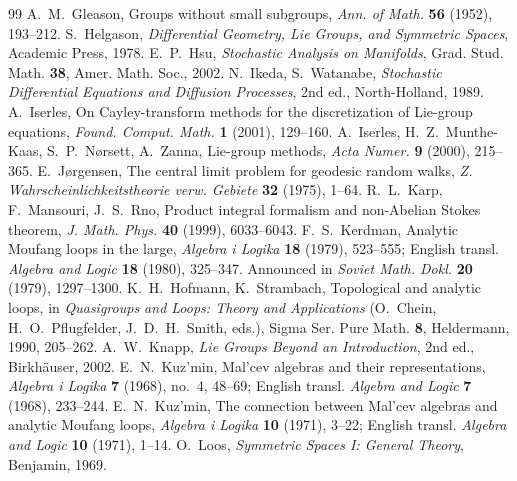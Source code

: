 \documentclass[11pt,reqno]{amsart}
\theoremstyle{definition}
\theoremstyle{remark}
\numberwithin{equation}{section}
\begin{document}
\begin{thebibliography}{99}
 A.~M.~Gleason, Groups without small subgroups, \emph{Ann. of Math.} \textbf{56} (1952), 193--212.
 S.~Helgason, \emph{Differential Geometry, Lie Groups, and Symmetric Spaces}, Academic Press, 1978.
 E.~P.~Hsu, \emph{Stochastic Analysis on Manifolds}, Grad. Stud. Math. \textbf{38}, Amer. Math. Soc., 2002.
 N.~Ikeda, S.~Watanabe, \emph{Stochastic Differential Equations and Diffusion Processes}, 2nd ed., North-Holland, 1989.
 A.~Iserles, On Cayley-transform methods for the discretization of Lie-group equations, \emph{Found. Comput. Math.} \textbf{1} (2001), 129--160.
 A.~Iserles, H.~Z.~Munthe-Kaas, S.~P.~N{\o}rsett, A.~Zanna, Lie-group methods, \emph{Acta Numer.} \textbf{9} (2000), 215--365.
 E.~J{\o}rgensen, The central limit problem for geodesic random walks, \emph{Z. Wahrscheinlichkeitstheorie verw. Gebiete} \textbf{32} (1975), 1--64.
 R.~L.~Karp, F.~Mansouri, J.~S.~Rno, Product integral formalism and non-Abelian Stokes theorem, \emph{J. Math. Phys.} \textbf{40} (1999), 6033--6043.
 F.~S.~Kerdman, Analytic Moufang loops in the large, \emph{Algebra i Logika} \textbf{18} (1979), 523--555; English transl. \emph{Algebra and Logic} \textbf{18} (1980), 325--347.  Announced in \emph{Soviet Math. Dokl.} \textbf{20} (1979), 1297--1300.
 K.~H.~Hofmann, K.~Strambach, Topological and analytic loops, in \emph{Quasigroups and Loops: Theory and Applications} (O.~Chein, H.~O.~Pflugfelder, J.~D.~H.~Smith, eds.), Sigma Ser. Pure Math. \textbf{8}, Heldermann, 1990, 205--262.
 A.~W.~Knapp, \emph{Lie Groups Beyond an Introduction}, 2nd ed., Birkh\"auser, 2002.
 E.~N.~Kuz'min, Mal'cev algebras and their representations, \emph{Algebra i Logika} \textbf{7} (1968), no.~4, 48--69; English transl. \emph{Algebra and Logic} \textbf{7} (1968), 233--244.
 E.~N.~Kuz'min, The connection between Mal'cev algebras and analytic Moufang loops, \emph{Algebra i Logika} \textbf{10} (1971), 3--22; English transl. \emph{Algebra and Logic} \textbf{10} (1971), 1--14.
 O.~Loos, \emph{Symmetric Spaces I: General Theory}, Benjamin, 1969.

\end{thebibliography}
\end{document}
